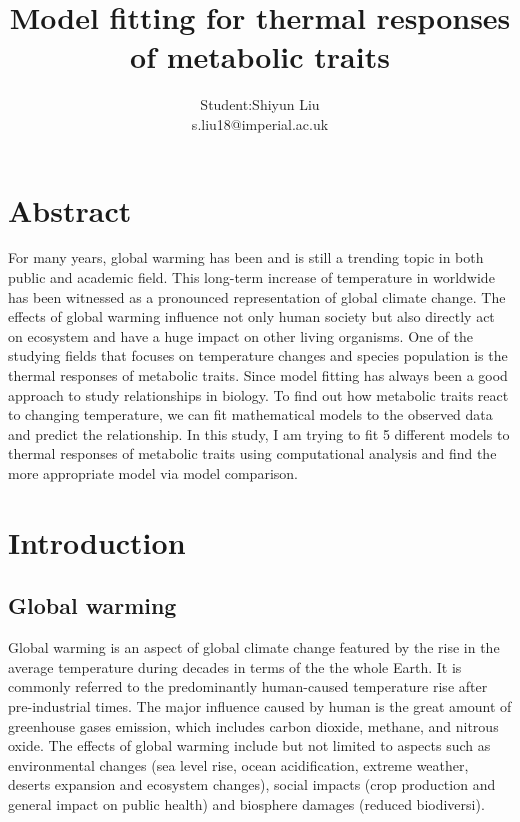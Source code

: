 \documentclass[12pt,a4paper]{article}
\title{Model fitting for thermal responses of metabolic traits}
\author{Student:Shiyun Liu\\ s.liu18@imperial.ac.uk}
\date{ }
\begin{document}
\maketitle

\newpage

\section{Abstract}
For many years, global warming has been and is still a trending topic in both public and academic field. This long-term increase of temperature in worldwide has been witnessed as a pronounced representation of global climate change. The effects of global warming influence not only human society but also directly act on ecosystem and have a huge impact on other living organisms. One of the studying fields that focuses on temperature changes and species population is the thermal responses of metabolic traits. Since model fitting has always been a good approach to study relationships in biology. To find out how metabolic traits react to changing temperature, we can fit mathematical models to the observed data and predict the relationship. In this study, I am trying to fit 5 different models to thermal responses of metabolic traits using computational analysis and find the more appropriate model via model comparison.

\section{Introduction}
\subsection{Global warming}
Global warming is an aspect of global climate change featured by the rise in the average temperature during decades in terms of the the whole Earth. It is commonly referred to the predominantly human-caused temperature rise after pre-industrial times. The major influence caused by human is the great amount of greenhouse gases emission, which includes carbon dioxide, methane, and nitrous oxide. The effects of global warming include but not limited to aspects such as environmental changes (sea level rise, ocean acidification, extreme weather,  deserts expansion and ecosystem changes), social impacts (crop production and general impact on public health) and biosphere damages (reduced biodiversi).
\cite{globalwarming}
\end{document}
